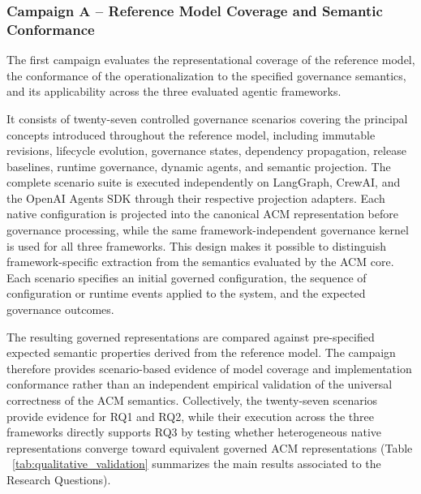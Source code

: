 \documentclass[10pt]{article}
\begin{document}
\subsubsection{Campaign A -- Reference Model Coverage and Semantic Conformance}

The first campaign evaluates the representational coverage of the reference model, the conformance of the operationalization to the specified governance semantics, and its applicability across the three evaluated agentic frameworks.

It consists of twenty-seven controlled governance scenarios covering the principal concepts introduced throughout the reference model, including immutable revisions, lifecycle evolution, governance states, dependency propagation, release baselines, runtime governance, dynamic agents, and semantic projection. The complete scenario suite is executed independently on LangGraph, CrewAI, and the OpenAI Agents SDK through their respective projection adapters. Each native configuration is projected into the canonical ACM representation before governance processing, while the same framework-independent governance kernel is used for all three frameworks. This design makes it possible to distinguish framework-specific extraction from the semantics evaluated by the ACM core. Each scenario specifies an initial governed configuration, the sequence of configuration or runtime events applied to the system, and the expected governance outcomes. 

The resulting governed representations are compared against pre-specified expected semantic properties derived from the reference model. The campaign therefore provides scenario-based evidence of model coverage and implementation conformance rather than an independent empirical validation of the universal correctness of the ACM semantics. Collectively, the twenty-seven scenarios provide evidence for RQ1 and RQ2, while their execution across the three frameworks directly supports RQ3 by testing whether heterogeneous native representations converge toward equivalent governed ACM representations (Table ~\ref{tab:qualitative_validation} summarizes the main results associated to the Research Questions). 
\end{document}
